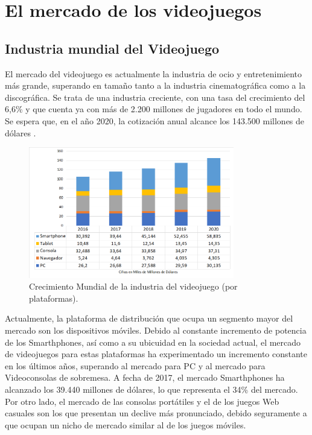 \section{El mercado de los videojuegos}

\subsection{Industria mundial del Videojuego}
El mercado del videojuego es actualmente la industria de ocio y entretenimiento más grande, superando en tamaño tanto a la industria cinematográfica como a la discográfica. Se trata de una industria creciente, con una tasa del crecimiento del 6,6\% y que cuenta ya con más de 2.200 millones de jugadores en todo el mundo. Se espera que, en el año 2020, la cotización anual alcance los 143.500 millones de dólares \cite{libro_blanco}.

\begin{figure}[h]
    \centering
    \includegraphics[width=0.8\textwidth]{images/estadodelarte/mercado/crecimiento_mercado_plataforma}
    \caption{Crecimiento Mundial de la industria del videojuego (por plataformas).}
\end{figure}

Actualmente, la plataforma de distribución que ocupa un segmento mayor del mercado son los dispositivos móviles. Debido al constante incremento de potencia de los Smarthphones, así como a su ubicuidad en la sociedad actual, el mercado de videojuegos para estas plataformas ha experimentado un incremento constante en los últimos años, superando al mercado para PC y al mercado para Videoconsolas de sobremesa. A fecha de 2017, el mercado Smarthphones ha alcanzado los 39.440 millones de dólares, lo que representa el 34\% del mercado. Por otro lado, el mercado de las consolas portátiles y el de los juegos Web casuales son los que presentan un declive más pronunciado, debido seguramente a que ocupan un nicho de mercado similar al de los juegos móviles\cite{libro_blanco}.

